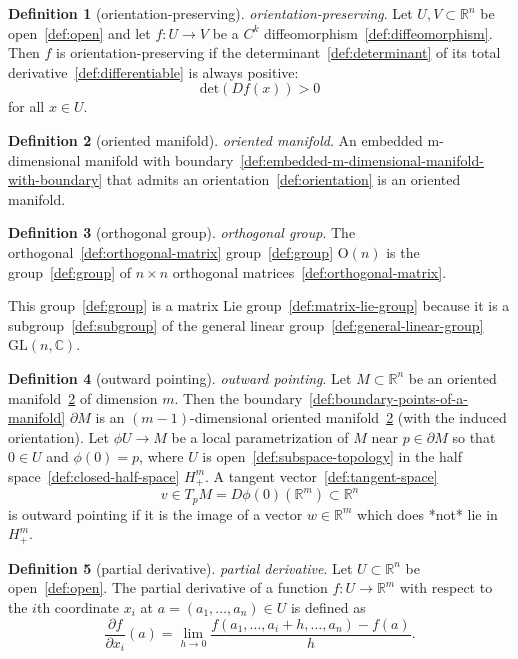 \documentclass[12pt,a4paper]{article}
\theoremstyle{definition}
\newtheorem{definition}{Definition}
\begin{document}
\begin{definition}[orientation-preserving]\label{def:orientation-preserving}
\emph{orientation-preserving}. Let $U, V \subset\mathbb R^n$ be open~\ref{def:open} and let $f:U\to V$ be a $C^k$ diffeomorphism~\ref{def:diffeomorphism}. Then $f$ is orientation-preserving if the determinant~\ref{def:determinant} of its total derivative~\ref{def:differentiable} is always positive: $$\text{det}(Df(x)) > 0$$ for all $x \in U$.
\end{definition}

\begin{definition}[oriented manifold]\label{def:oriented-manifold}
\emph{oriented manifold}. An embedded m-dimensional manifold with boundary~\ref{def:embedded-m-dimensional-manifold-with-boundary} that admits an orientation~\ref{def:orientation} is an oriented manifold.
\end{definition}

\begin{definition}[orthogonal group]\label{def:orthogonal-group}
\emph{orthogonal group}. The orthogonal~\ref{def:orthogonal-matrix} group~\ref{def:group} $\text{O}(n)$ is the group~\ref{def:group} of $n\times n$ orthogonal matrices~\ref{def:orthogonal-matrix}.

This group~\ref{def:group} is a matrix Lie group~\ref{def:matrix-lie-group} because it is a subgroup~\ref{def:subgroup} of the general linear group~\ref{def:general-linear-group} $\text{GL}(n,\mathbb C)$.
\end{definition}

\begin{definition}[outward pointing]\label{def:outward-pointing}
\emph{outward pointing}. Let $M \subset \mathbb R^n$ be an oriented manifold~\ref{def:oriented-manifold} of dimension $m$. Then the boundary~\ref{def:boundary-points-of-a-manifold} $\partial M$ is an $(m-1)$-dimensional oriented manifold~\ref{def:oriented-manifold} (with the induced orientation). Let $\phi U\to M$ be a local parametrization of $M$ near $p \in \partial M$ so that $0 \in U$ and $\phi(0) = p$, where $U$ is open~\ref{def:subspace-topology} in the half space~\ref{def:closed-half-space} $H^m_+$. A tangent vector~\ref{def:tangent-space} $$v \in T_pM = D\phi(0)(\mathbb R^m)\subset\mathbb R^n$$ is outward pointing if it is the image of a vector $w \in \mathbb R^m$ which does *not* lie in $H_+^m$.
\end{definition}

\begin{definition}[partial derivative]\label{def:partial-derivative}
\emph{partial derivative}. Let $U \subset \mathbb R^n$ be open~\ref{def:open}. The partial derivative of a function $f:U\to\mathbb R^m$ with respect to the $i$th coordinate $x_i$ at $a = (a_1,\dots,a_n) \in U$ is defined as $$\frac{\partial f}{\partial x_i}(a) = \lim_{h\to 0} \frac{f(a_1,\dots,a_i+h,\dots,a_n) - f(a)}{h}.$$
\end{definition}
\end{document}
